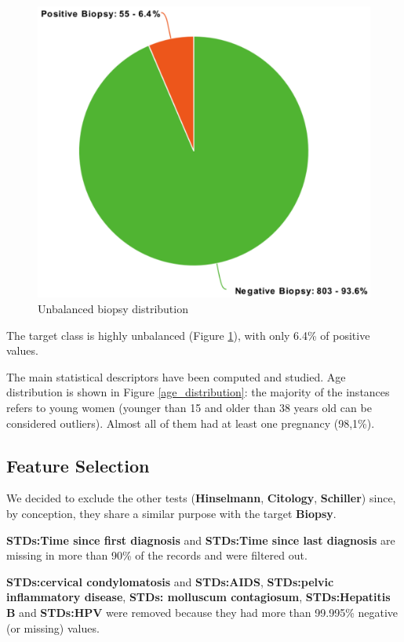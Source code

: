 \begin{figure}
    \centerline{
        \includegraphics[width=0.3\paperwidth]{figures/class_unbalance.png}}
    \caption{Unbalanced biopsy distribution}
    \label{unbalanced_biopsy}
\end{figure}

The target class is highly unbalanced (Figure \ref{unbalanced_biopsy}), with only 6.4\% of positive values.

The main statistical descriptors have been computed and studied. Age distribution is shown in Figure \ref{age_distribution}: the majority of the instances refers to young women (younger than 15 and older than 38 years old can be considered outliers). Almost all of them had at least one pregnancy (98,1\%).

\subsection{Feature Selection}

We decided to exclude the other tests (\textbf{Hinselmann}, \textbf{Citology}, \textbf{Schiller}) since, by conception, they share a similar purpose with the target \textbf{Biopsy}.

\textbf{STDs:Time since first diagnosis} and \textbf{STDs:Time since last diagnosis} are missing in more than 90\% of the records and were filtered out.

\textbf{STDs:cervical condylomatosis} and \textbf{STDs:AIDS}, \textbf{STDs:pelvic inflammatory disease}, \textbf{STDs: molluscum contagiosum}, \textbf{STDs:Hepatitis B} and \textbf{STDs:HPV} were removed because they had more than 99.995\% negative (or missing) values.

